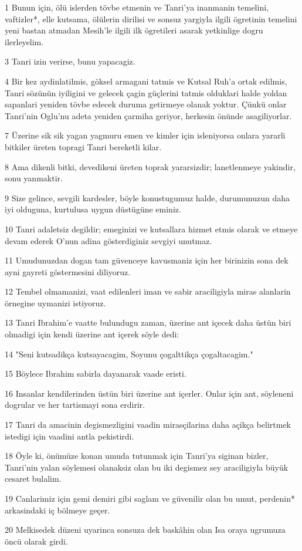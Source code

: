 \par 1 Bunun için, ölü islerden tövbe etmenin ve Tanri'ya inanmanin temelini, vaftizler*, elle kutsama, ölülerin dirilisi ve sonsuz yargiyla ilgili ögretinin temelini yeni bastan atmadan Mesih'le ilgili ilk ögretileri asarak yetkinlige dogru ilerleyelim.
\par 3 Tanri izin verirse, bunu yapacagiz.
\par 4 Bir kez aydinlatilmis, göksel armagani tatmis ve Kutsal Ruh'a ortak edilmis, Tanri sözünün iyiligini ve gelecek çagin güçlerini tatmis olduklari halde yoldan sapanlari yeniden tövbe edecek duruma getirmeye olanak yoktur. Çünkü onlar Tanri'nin Oglu'nu adeta yeniden çarmiha geriyor, herkesin önünde asagiliyorlar.
\par 7 Üzerine sik sik yagan yagmuru emen ve kimler için isleniyorsa onlara yararli bitkiler üreten topragi Tanri bereketli kilar.
\par 8 Ama dikenli bitki, devedikeni üreten toprak yararsizdir; lanetlenmeye yakindir, sonu yanmaktir.
\par 9 Size gelince, sevgili kardesler, böyle konustugumuz halde, durumunuzun daha iyi olduguna, kurtulusa uygun düstügüne eminiz.
\par 10 Tanri adaletsiz degildir; emeginizi ve kutsallara hizmet etmis olarak ve etmeye devam ederek O'nun adina gösterdiginiz sevgiyi unutmaz.
\par 11 Umudunuzdan dogan tam güvenceye kavusmaniz için her birinizin sona dek ayni gayreti göstermesini diliyoruz.
\par 12 Tembel olmamanizi, vaat edilenleri iman ve sabir araciligiyla miras alanlarin örnegine uymanizi istiyoruz.
\par 13 Tanri Ibrahim'e vaatte bulundugu zaman, üzerine ant içecek daha üstün biri olmadigi için kendi üzerine ant içerek söyle dedi:
\par 14 "Seni kutsadikça kutsayacagim, Soyunu çogalttikça çogaltacagim."
\par 15 Böylece Ibrahim sabirla dayanarak vaade eristi.
\par 16 Insanlar kendilerinden üstün biri üzerine ant içerler. Onlar için ant, söyleneni dogrular ve her tartismayi sona erdirir.
\par 17 Tanri da amacinin degismezligini vaadin mirasçilarina daha açikça belirtmek istedigi için vaadini antla pekistirdi.
\par 18 Öyle ki, önümüze konan umuda tutunmak için Tanri'ya siginan bizler, Tanri'nin yalan söylemesi olanaksiz olan bu iki degismez sey araciligiyla büyük cesaret bulalim.
\par 19 Canlarimiz için gemi demiri gibi saglam ve güvenilir olan bu umut, perdenin* arkasindaki iç bölmeye geçer.
\par 20 Melkisedek düzeni uyarinca sonsuza dek baskâhin olan Isa oraya ugrumuza öncü olarak girdi.

